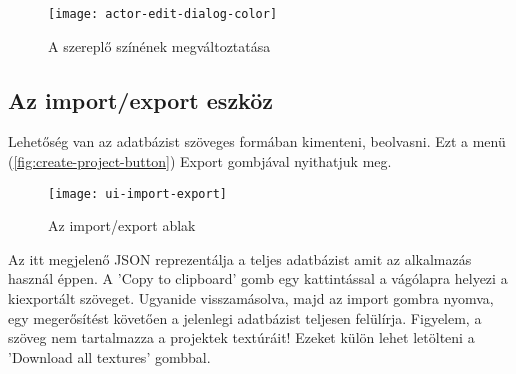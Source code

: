 \begin{figure}[h!]
	\centering
	\texttt{[image: actor-edit-dialog-color]}
	\caption{A szereplő színének megváltoztatása}
	\label{fig:actor-edit-dialog-color}
\end{figure}


\subsection{Az import/export eszköz} \label{section:ui-import-export}

Lehetőség van az adatbázist szöveges formában kimenteni, beolvasni. Ezt a menü (\ref{fig:create-project-button}) Export gombjával nyithatjuk meg.

\begin{figure}[h!]
	\centering
	\texttt{[image: ui-import-export]}
	\caption{Az import/export ablak}
	\label{fig:ui-import-export}
\end{figure}

Az itt megjelenő JSON \cite{JSON} reprezentálja a teljes adatbázist amit az alkalmazás használ éppen. A 'Copy to clipboard' gomb egy kattintással a vágólapra helyezi a kiexportált szöveget. Ugyanide visszamásolva, majd az import gombra nyomva, egy megerősítést követően a jelenlegi adatbázist teljesen felülírja. Figyelem, a szöveg nem tartalmazza a projektek textúráit! Ezeket külön lehet letölteni a 'Download all textures' gombbal.

